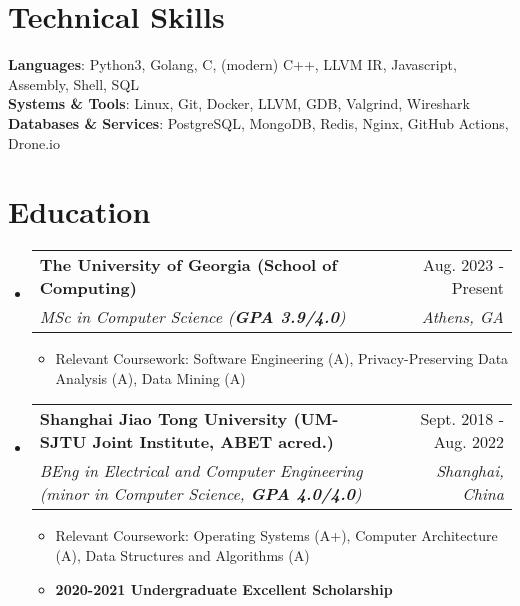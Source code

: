 \documentclass[letterpaper,11pt]{article}
\makeatletter
\newcommand{\resumeItem}[1]{
  \item\small{
    {#1 \vspace{-2pt}}
  }
}
\newcommand{\resumeSubHeader}[4]{
  \vspace{-2pt}\item
    \begin{tabular*}{0.98\textwidth}[t]{l@{\extracolsep{\fill}}r}
      \textbf{#1} & #2 \\
      \textit{\small#3} & \textit{\small #4} \\
    \end{tabular*}\vspace{-7pt}
}
\newcommand{\resumeSubHeaderListStart}{\begin{itemize}[leftmargin=0.15in, label={}]}
\newcommand{\resumeSubHeaderListEnd}{\end{itemize}}
\newcommand{\resumeItemListStart}{\begin{itemize}}
\newcommand{\resumeItemListEnd}{\end{itemize}\vspace{-5pt}}
\makeatother
\begin{document}
\section{Technical Skills}
 \begin{itemize}[leftmargin=0.15in, label={}]
    \small{
      \item{
     \textbf{Languages}{: Python3, Golang, C, (modern) C++, LLVM IR, Javascript, Assembly, Shell, SQL} \\
     \textbf{Systems \& Tools}{: Linux, Git, Docker, LLVM, GDB, Valgrind, Wireshark} \\
     \textbf{Databases \& Services}{: PostgreSQL, MongoDB, Redis, Nginx, GitHub Actions, Drone.io}
    }}
 \end{itemize}

\section{Education}
  \resumeSubHeaderListStart
    \resumeSubHeader
      {The University of Georgia (School of Computing)}{Aug. 2023 - Present}
      {MSc in Computer Science (\textbf{GPA 3.9/4.0})}{Athens, GA}
      \resumeItemListStart
        \resumeItem{Relevant Coursework: Software Engineering (A), Privacy-Preserving Data Analysis (A), Data Mining (A)}
      \resumeItemListEnd
    \resumeSubHeader
      {Shanghai Jiao Tong University (UM-SJTU Joint Institute, ABET acred.)}{Sept. 2018 - Aug. 2022}
      {BEng in Electrical and Computer Engineering (minor in Computer Science, \textbf{GPA 4.0/4.0})}{Shanghai, China}
      \resumeItemListStart
        \resumeItem{Relevant Coursework: Operating Systems (A+), Computer Architecture (A), Data Structures and Algorithms (A)}
        \resumeItem{\textbf{2020-2021 Undergraduate Excellent Scholarship}}
      \resumeItemListEnd
  \resumeSubHeaderListEnd
\end{document}
